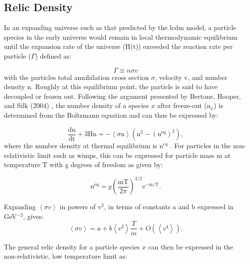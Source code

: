 \subsection{Relic Density}
In an expanding universe such as that predicted by the \gls{lcdm} model, a particle species in the early universe would remain in local thermodynamic equilibrium until the expansion rate of the universe (H(t)) exceeded the reaction rate per particle ($\Gamma$) defined as:

\begin{equation}
\Gamma \equiv n \sigma v
\label{Eq:gamma}
\end{equation}
with the particles total annihilation cross section $\sigma$, velocity v, and number density n. Roughly at this equilibrium point, the particle is said to have decoupled or frozen out. Following the argument presented by Bertone, Hooper, and Silk (2004) \cite{particlDarkMatterReview}, the number density of a species $x$ after freeze-out (n$_x$) is determined from the Boltzmann equation and can thus be expressed by:

\begin{equation}
\frac{\text{dn}}{\text{dt}} + \text{3Hn} = -\left< \sigma \text{n} \right> (\text{n}^2-(\text{n}^{\text{eq}})^2),
\label{Eq:numDensityRelics}
\end{equation}
where the number density at thermal equilibrium is n$^{eq}$ \cite{particlDarkMatterReview}. For particles in the non-relativistic limit such as \gls{wimp}s, this can be expressed for particle mass m at temperature T with g degrees of freedom as given by:

\begin{equation}
\label{Eq:numDensityRelicsApprox}
\text{n}^{\text{eq}} = g\left(\frac{\text{m} \text{T}}{2 \pi}\right)^{3/2} \text{e}^{-\text{m/T}}.
\end{equation}

Expanding $\left< \sigma v\right>$ in powers of v$^2$, in terms of constants a and b expressed in GeV$^{-2}$, gives:
\begin{equation}
\label{Eq:annihilCrossSectionThermal}
\left< \sigma v\right> = a + b\left<v^2\right>\frac{T}{m} + \textit{O}{(\left<v^4\right>)}.
\end{equation}

The general relic density for a particle species $x$ can then be expressed in the non-relativistic, low temperature limit as:

